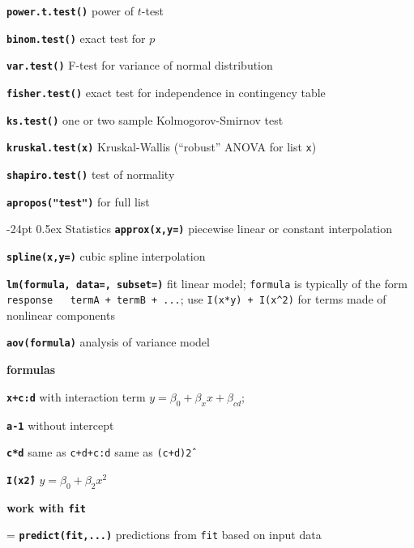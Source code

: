 \documentclass[8pt,landscape]{article}
\makeatletter
\renewcommand\section{\@startsection{section}{1}{0mm}%
                                     {-24pt}%
                                     {0.5ex}%
                                {\color{blue}\normalfont\large\bfseries}}
\newcommand{\code}{\texttt}
\newcommand{\bcode}[1]{\texttt{\textbf{#1}}}
\makeatother
\begin{document}
\begin{multicols*}{3}
\bcode{power.t.test()} power of $t$-test

\bcode{binom.test()} exact test for $p$

\bcode{var.test()} F-test for variance of normal distribution

\bcode{fisher.test()} exact test for independence in contingency table

\bcode{ks.test()} one or two sample Kolmogorov-Smirnov test

\bcode{kruskal.test(x)} Kruskal-Wallis (``robust'' ANOVA for list \code{x})

\bcode{shapiro.test()} test of normality

\bcode{apropos("test")} for full list 

\section{Statistics}
\bcode{approx(x,y=)} piecewise linear or constant interpolation

\bcode{spline(x,y=)} cubic spline interpolation



\bcode{lm(formula, data=, subset=)} fit linear model; \code{formula} is typically of
     the form \code{response ~ termA + termB + ...}; use \code{I(x*y)
     + I(x\^{}2)} for terms made of nonlinear components

\bcode{aov(formula)} analysis of variance model

{\color{blue}\bf formulas}

\bcode{x+c:d}  with interaction term $y=\beta_0 + \beta_x x + \beta_{cd}$;  

\bcode{a-1} without intercept

\bcode{c*d} same as \code{c+d+c:d} same as \code{(c+d)\^2}

\bcode{I(x\^2)} $y=\beta_0 + \beta_2 x^2$
     



{\color{blue}\bf work with \code{fit}}

\everypar={\hangindent=9mm}
\bcode{predict(fit,...)}  predictions from \code{fit} based on input data


\end{multicols*}
\end{document}
